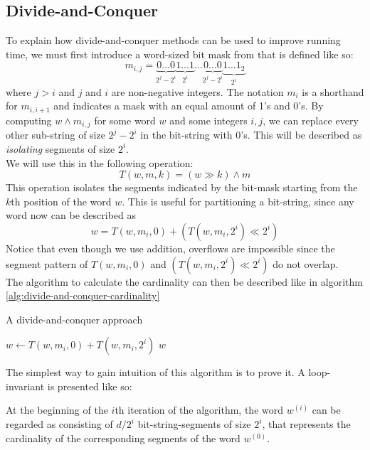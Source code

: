 \subsection{Divide-and-Conquer}
To explain how divide-and-conquer methods can be used to improve running time, we must first introduce a word-sized bit mask from \cite{fast-similarity-search} that is defined like so:
$$m_{i,j} = \underbrace{0\dots 0}_{2^{j}-2^{i}}\underbrace{1\dots 1}_{2^i}\dots\underbrace{0\dots 0}_{2^{j}-2^{i}}\underbrace{1\dots 1_2}_{2^i}$$
where $j > i$ and $j$ and $i$ are non-negative integers. The notation $m_{i}$ is a shorthand for $m_{i, i+1}$ and indicates a mask with an equal amount of 1's and 0's. By computing $w \land m_{i,j}$ for some word $w$ and some integers $i, j$, we can replace every other sub-string of size $2^j-2^i$ in the bit-string with 0's. This will be described as \textit{isolating} segments of size $2^i$.\\
We will use this in the following operation:
\begin{equation}
    T(w, m, k) = (w\gg k) \land m
\end{equation}
This operation isolates the segments indicated by the bit-mask starting from the $k$th position of the word $w$. This is useful for partitioning a bit-string, since any word now can be described as
$$w=T(w, m_i, 0) + (T(w, m_i, 2^i) \ll 2^i)$$
Notice that even though we use addition, overflows are impossible since the segment pattern of $T(w, m_i, 0)$ and $(T(w, m_i, 2^i) \ll 2^i)$ do not overlap.\\
The algorithm to calculate the cardinality can then be described like in algorithm \ref{alg:divide-and-conquer-cardinality}
\begin{algorithm}[H]
\caption{A divide-and-conquer approach}\label{alg:divide-and-conquer-cardinality}
\begin{algorithmic}[1]
 
\State $w \gets T(w, m_i, 0) + T(w, m_i, 2^i)$
\EndFor
\State \Return $w$
\EndFunction
\end{algorithmic}
\end{algorithm}
The simplest way to gain intuition of this algorithm is to prove it. A loop-invariant is presented like so:
\begin{invariant}
\label{thm:divide-invariant}
At the beginning of the $i$th iteration of the algorithm, the word $w^{(i)}$ can be regarded as consisting of $d/2^i$ bit-string-segments of size $2^i$, that represents the cardinality of the corresponding segments of the word $w^{(0)}$.
\end{invariant}
